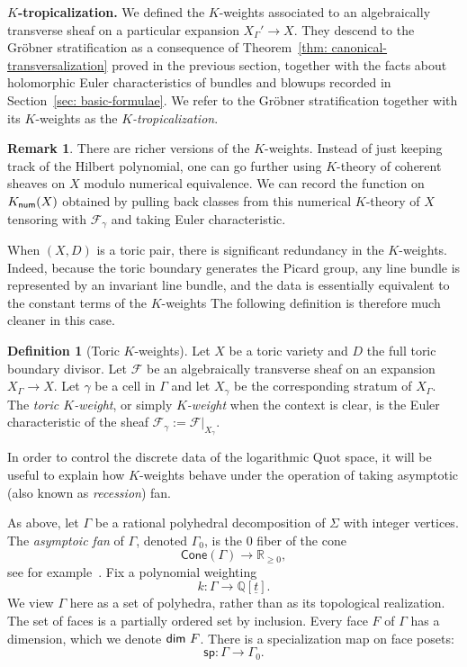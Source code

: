 \documentclass[11pt]{amsart}
\theoremstyle{definition}
\theoremstyle{definition}
\newtheorem{remark}[theorem]{Remark}
\newtheorem{definition}[theorem]{Definition}
\begin{document}
\noindent
{\bf $K$-tropicalization.} We defined the $K$-weights associated to an algebraically transverse sheaf on a particular expansion $X_\Gamma'\to X$. They descend to the Gr\"obner stratification as a consequence of Theorem~\ref{thm: canonical-transversalization} proved in the previous section, together with the facts about holomorphic Euler characteristics of bundles and blowups recorded in Section~\ref{sec: basic-formulae}. We refer to the Gr\"obner stratification together with its $K$-weights as the {\it $K$-tropicalization}. 

\begin{remark}
There are richer versions of the $K$-weights. Instead of just keeping track of the Hilbert polynomial, one can go further using $K$-theory of coherent sheaves on $X$ modulo numerical equivalence. We can record the function on $K_{\sf num}(X)$ obtained by pulling back classes from this numerical $K$-theory of $X$ tensoring with $\mathcal F_\gamma$ and taking Euler characteristic.
\end{remark}

When $(X,D)$ is a toric pair, there is significant redundancy in the $K$-weights. Indeed, because the toric boundary generates the Picard group, any line bundle is represented by an invariant line bundle, and the data is essentially equivalent to the constant terms of the $K$-weights The following definition is therefore much cleaner in this case.

\begin{definition}[Toric $K$-weights]
Let $X$ be a toric variety and $D$ the full toric boundary divisor. Let $\mathcal F$ be an algebraically transverse sheaf on an expansion $X_\Gamma\to X$. Let $\gamma$ be a cell in $\Gamma$ and let $X_\gamma$ be the corresponding stratum of $X_\Gamma$. The {\it toric $K$-weight}, or simply {\it $K$-weight} when the context is clear, is the Euler characteristic of the sheaf $\mathcal F_\gamma:=\mathcal F|_{X_\gamma}$. 
\end{definition}


In order to control the discrete data of the logarithmic Quot space, it will be useful to explain how $K$-weights behave under the operation of taking asymptotic (also known as {\it recession}) fan. 

As above, let $\Gamma$ be a rational polyhedral decomposition of $\Sigma$ with integer vertices. The {\it asymptoic fan} of $\Gamma$, denoted $\Gamma_0$, is the $0$ fiber of the cone
\[
\mathsf{Cone}(\Gamma)\to\mathbb R_{\geq 0},
\]
see for example~\cite{BGS11,NishSieb06}. Fix a polynomial weighting
\[
k\colon \Gamma \to\mathbb Q[\underline t].
\]
We view $\Gamma$ here as a set of polyhedra, rather than as its topological realization. 
The set of faces is a partially ordered set by inclusion. Every face $F$ of $\Gamma$ has a dimension, which we denote ${\sf dim} \ F$. There is a specialization map on face posets:
\[
\mathsf{sp}\colon \Gamma\to \Gamma_0. 
\]
\end{document}
